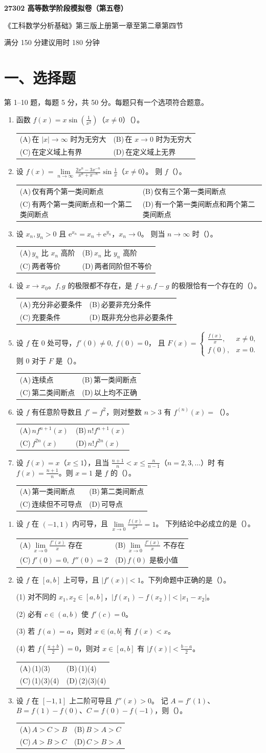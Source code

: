 \documentclass[UTF8,a4paper,zihao=-4,fontset=fandol]{ctexart}
\makeatletter
\renewcommand{\lim}{\operatorname*{lim}\limits}
\newcommand{\choices}[4]{%
  \par\noindent\begin{tabularx}{\linewidth}{@{}X@{\hspace{1em}}X@{}}
    (A)\,#1 & (B)\,#2 \\
    (C)\,#3 & (D)\,#4
  \end{tabularx}\par}
\newcommand{\paper}[1]{%
  \pdfbookmark[0]{第#1卷}{paper.\thepage}%
  \begin{center}
    {\LARGE\bfseries 27302 高等数学阶段模拟卷（第#1卷）\par}
    \small 《工科数学分析基础》第三版上册第一章至第二章第四节\par
    满分 150 分\qquad 建议用时 180 分钟
  \end{center}
  \section*{一、选择题}
  第 1--10 题，每题 5 分，共 50 分。每题只有一个选项符合题意。}
\makeatother
\begin{document}
\newpage
\paper{五}
\begin{enumerate}
\item 函数 $f(x)=x\sin(\frac{1}{x^2})$（$x\ne0$）（\quad）。
\choices{在 $|x|\to\infty$ 时为无穷大}{在 $x\to0$ 时为无穷大}
{在定义域上有界}{在定义域上无界}
\item 设 $\displaystyle f(x)=\lim_{n\to\infty}\frac{2x^n-3x^{-n}}{x^n+x^{-n}}\sin\frac1x$（$x\ne0$）。
则 $f$（\quad）。
\choices{仅有两个第一类间断点}{仅有三个第一类间断点}
{有两个第一类间断点和一个第二类间断点}{有一个第一类间断点和两个第二类间断点}
\item 设 $x_n,y_n>0$ 且 $\mathrm{e}^{x_n}=x_n+\mathrm{e}^{y_n}$，$x_n\to0$。
则当 $n\to\infty$ 时（\quad）。
\choices{$y_n$ 比 $x_n$ 高阶}{$x_n$ 比 $y_n$ 高阶}{两者等价}{两者同阶但不等价}
\item 设 $x\to x_0$。$f,g$ 的极限都不存在，是 $f+g,f-g$ 的极限恰有一个存在的（\quad）。
\choices{充分非必要条件}{必要非充分条件}{充要条件}{既非充分也非必要条件}
\item 设 $f$ 在 $0$ 处可导，$f'(0)\ne0,\ f(0)=0$，
且 $F(x)=\begin{cases}\frac{f(x)}{x},&x\ne0,\\f(0),&x=0.\end{cases}$
则 $0$ 对于 $F$ 是（\quad）。
\choices{连续点}{第一类间断点}{第二类间断点}{以上均不正确}
\item 设 $f$ 有任意阶导数且 $f'=f^2$，则对整数 $n>3$ 有 $f^{(n)}(x)=$（\quad）。
\choices{$nf^{n+1}(x)$}{$n!f^{n+1}(x)$}{$f^{2n}(x)$}{$n!f^{2n}(x)$}
\item 设 $f(x)=x$（$x\le1$），且当 $\frac{n+1}{n}<x\le\frac{n}{n-1}$（$n=2,3,\dots$）时
有 $f(x)=\frac{n+1}{n}$。则 $x=1$ 是 $f$ 的（\quad）。
\choices{第一类间断点}{第二类间断点}{连续但不可导点}{可导点}
\end{enumerate}
\newpage
\begin{enumerate}[start=8]
\item 设 $f$ 在 $(-1,1)$ 内可导，且 $\displaystyle\lim_{x\to0}\frac{f(x)}{x^2}=1$。
下列结论中必成立的是（\quad）。
\choices{$\lim_{x\to0}\frac{f'(x)}{x}$ 存在}{$\lim_{x\to0}\frac{f'(x)}{x}$ 不存在}
{$f'(0)=0,\ f''(0)=2$}{$f(0)$ 是极小值}
\item 设 $f$ 在 $[a,b]$ 上可导，且 $|f'(x)|<1$。下列命题中正确的是（\quad）。
\par (1) 对不同的 $x_1,x_2\in[a,b]$，$|f(x_1)-f(x_2)|<|x_1-x_2|$。
\par (2) 必有 $c\in(a,b)$ 使 $f'(c)=0$。
\par (3) 若 $f(a)=a$，则对 $x\in(a,b]$ 有 $f(x)<x$。
\par (4) 若 $f(\frac{a+b}{2})=0$，则对 $x\in[a,b]$ 有 $|f(x)|<\frac{b-a}{2}$。
\choices{(1)(3)}{(1)(4)}{(1)(3)(4)}{(2)(3)(4)}
\item 设 $f$ 在 $[-1,1]$ 上二阶可导且 $f''(x)>0$。
记 $A=f'(1)$、$B=f(1)-f(0)$、$C=f(0)-f(-1)$，则（\quad）。
\choices{$A>C>B$}{$B>A>C$}{$A>B>C$}{$C>B>A$}
\end{enumerate}
\end{document}

